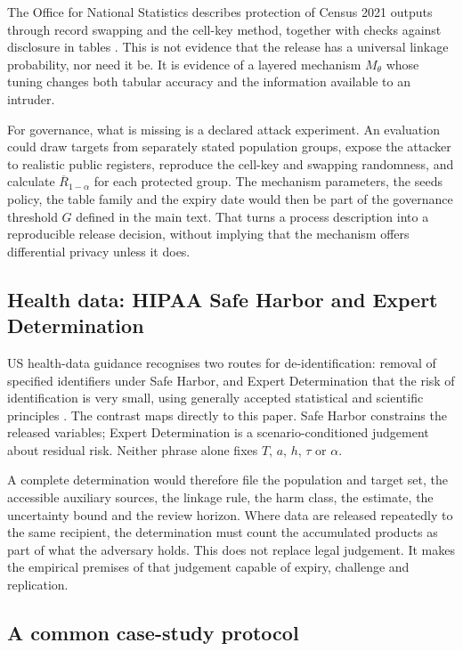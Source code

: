 \documentclass[11pt,a4paper]{article}
\theoremstyle{plain}
\theoremstyle{definition}
\begin{document}
The Office for National Statistics describes protection of Census 2021 outputs
through record swapping and the cell-key method, together with checks against
disclosure in tables \citep{ons2022}. This is not evidence that the release has a
universal linkage probability, nor need it be. It is evidence of a layered
mechanism $M_\theta$ whose tuning changes both tabular accuracy and the
information available to an intruder.

For governance, what is missing is a declared attack experiment. An evaluation
could draw targets from separately stated population groups, expose the attacker
to realistic public registers, reproduce the cell-key and swapping randomness,
and calculate $\overline{R}_{1-\alpha}$ for each protected group. The mechanism
parameters, the seeds policy, the table family and the expiry date would then be
part of the governance threshold $G$ defined in the main text. That turns a process description into a
reproducible release decision, without implying that the mechanism offers
differential privacy unless it does.

\subsection{Health data: HIPAA Safe Harbor and Expert Determination}

US health-data guidance recognises two routes for de-identification: removal of
specified identifiers under Safe Harbor, and Expert Determination that the risk
of identification is very small, using generally accepted statistical and
scientific principles \citep{hhs2012}. The contrast maps directly to this paper.
Safe Harbor constrains the released variables; Expert Determination is a
scenario-conditioned judgement about residual risk. Neither phrase alone fixes
$T$, $a$, $h$, $\tau$ or $\alpha$.

A complete determination would therefore file the population and target set, the
accessible auxiliary sources, the linkage rule, the harm class, the estimate, the
uncertainty bound and the review horizon. Where data are released repeatedly to
the same recipient, the determination must count the accumulated products as part
of what the adversary holds. This does not replace legal judgement. It makes the
empirical premises of that judgement capable of expiry, challenge and
replication.

\subsection{A common case-study protocol}
\end{document}
